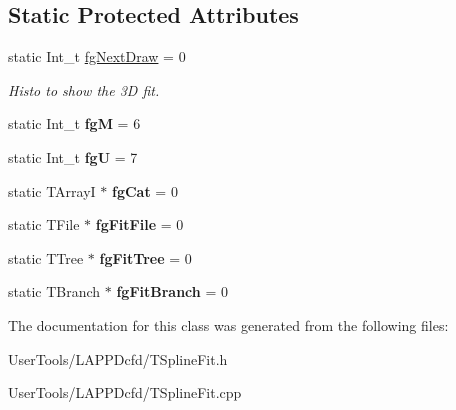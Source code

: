 \subsection*{Static Protected Attributes}
\begin{DoxyCompactItemize}
\item 
\hypertarget{classTSplineFit_ae2d9de3b3b77b2987163ff3509f6e538}{
static Int\_\-t \hyperlink{classTSplineFit_ae2d9de3b3b77b2987163ff3509f6e538}{fgNextDraw} = 0}
\label{classTSplineFit_ae2d9de3b3b77b2987163ff3509f6e538}

\begin{DoxyCompactList}\small\item\em Histo to show the 3D fit. \item\end{DoxyCompactList}\item 
\hypertarget{classTSplineFit_a9d5ec2d6f377523e0aa70ac4e7de3298}{
static Int\_\-t {\bfseries fgM} = 6}
\label{classTSplineFit_a9d5ec2d6f377523e0aa70ac4e7de3298}

\item 
\hypertarget{classTSplineFit_a1107612acb0badbb171ddd236edbc5d2}{
static Int\_\-t {\bfseries fgU} = 7}
\label{classTSplineFit_a1107612acb0badbb171ddd236edbc5d2}

\item 
\hypertarget{classTSplineFit_a1a572a629004cfa802ed8713ade7422d}{
static TArrayI $\ast$ {\bfseries fgCat} = 0}
\label{classTSplineFit_a1a572a629004cfa802ed8713ade7422d}

\item 
\hypertarget{classTSplineFit_a663befdd68f895ca01acd08403aced71}{
static TFile $\ast$ {\bfseries fgFitFile} = 0}
\label{classTSplineFit_a663befdd68f895ca01acd08403aced71}

\item 
\hypertarget{classTSplineFit_aeec11e5f9803681a38d01ac59666a8c7}{
static TTree $\ast$ {\bfseries fgFitTree} = 0}
\label{classTSplineFit_aeec11e5f9803681a38d01ac59666a8c7}

\item 
\hypertarget{classTSplineFit_a2d6ef8fa049c35f1ff919b1e4d78f73e}{
static TBranch $\ast$ {\bfseries fgFitBranch} = 0}
\label{classTSplineFit_a2d6ef8fa049c35f1ff919b1e4d78f73e}

\end{DoxyCompactItemize}


The documentation for this class was generated from the following files:\begin{DoxyCompactItemize}
\item 
UserTools/LAPPDcfd/TSplineFit.h\item 
UserTools/LAPPDcfd/TSplineFit.cpp\end{DoxyCompactItemize}
